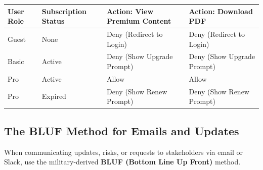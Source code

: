 \begin{longtable}[]{@{}
  >{\raggedright\arraybackslash}p{}
  >{\raggedright\arraybackslash}p{}
  >{\raggedright\arraybackslash}p{}
  >{\raggedright\arraybackslash}p{}@{}}
\toprule\noalign{}
\begin{minipage}[b]{\linewidth}\raggedright
User Role
\end{minipage} & \begin{minipage}[b]{\linewidth}\raggedright
Subscription Status
\end{minipage} & \begin{minipage}[b]{\linewidth}\raggedright
Action: View Premium Content
\end{minipage} & \begin{minipage}[b]{\linewidth}\raggedright
Action: Download PDF
\end{minipage} \\
\midrule\noalign{}
\endhead
\bottomrule\noalign{}
\endlastfoot
Guest & None & Deny (Redirect to Login) & Deny (Redirect to Login) \\
Basic & Active & Deny (Show Upgrade Prompt) & Deny (Show Upgrade
Prompt) \\
Pro & Active & Allow & Allow \\
Pro & Expired & Deny (Show Renew Prompt) & Deny (Show Renew Prompt) \\
\end{longtable}

\subsection{The BLUF Method for Emails and
Updates}\label{the-bluf-method-for-emails-and-updates}

When communicating updates, risks, or requests to stakeholders via email
or Slack, use the military-derived \textbf{BLUF (Bottom Line Up Front)}
method.

